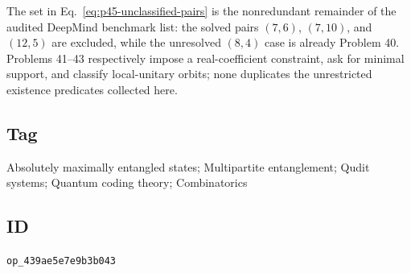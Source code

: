 The set in Eq.~\eqref{eq:p45-unclassified-pairs} is the nonredundant remainder
of the audited DeepMind benchmark list: the solved pairs $(7,6)$, $(7,10)$,
and $(12,5)$ are excluded, while the unresolved $(8,4)$ case is already
Problem 40.  Problems 41--43 respectively impose a real-coefficient
constraint, ask for minimal support, and classify local-unitary orbits; none
duplicates the unrestricted existence predicates collected here.

\subsection*{Tag}

Absolutely maximally entangled states; Multipartite entanglement; Qudit systems;
Quantum coding theory; Combinatorics

\subsection*{ID}

\texttt{op\_439ae5e7e9b3b043}
